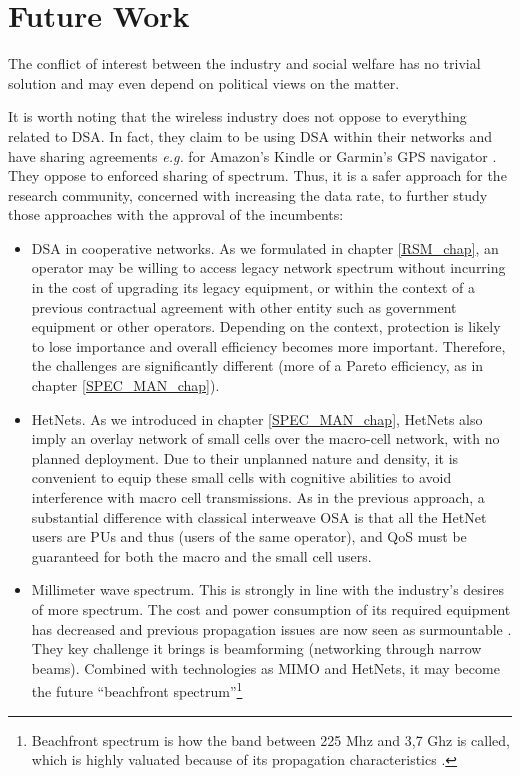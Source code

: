\section{Future Work}
The conflict of interest between the industry and social welfare has no trivial solution and may even depend on political views on the matter. 

It is worth noting that the wireless industry does not oppose to everything related to DSA. In fact, they claim to be using DSA within their networks and 
have sharing agreements \textit{e.g.} for Amazon's Kindle or Garmin's GPS navigator \cite{CTIA2011}. They oppose to enforced sharing of spectrum. Thus, it is a safer approach for the research community, concerned with increasing the data rate, to further study those approaches with the approval of the incumbents:
\begin{itemize}
\item DSA in cooperative networks. As we formulated in chapter \ref{RSM_chap}, an operator may be willing to access legacy network spectrum without incurring in the cost of upgrading its legacy equipment, or within the context of a previous contractual agreement with other entity such as government equipment or other operators. Depending on the context, protection is likely to lose importance and overall efficiency becomes more important. Therefore, the challenges are significantly different (more of a Pareto efficiency, as in chapter \ref{SPEC_MAN_chap}). %
\item HetNets. As we introduced in chapter \ref{SPEC_MAN_chap}, HetNets also imply an overlay network of small cells over the macro-cell network, with no planned deployment. Due to their unplanned nature and density, it is convenient to equip these small cells with cognitive abilities to avoid interference with macro cell transmissions. As in the previous approach, a substantial difference with classical interweave OSA is that all
the HetNet users are PUs and thus (users of the same operator), and QoS must be guaranteed for both the macro and the small cell users. 
\item Millimeter wave spectrum. This is strongly in line with the industry's desires of more spectrum. The cost and power consumption of its required equipment has decreased and previous propagation issues are now seen as surmountable \cite{Andrews2014}. They key challenge it brings is beamforming (networking through narrow beams). Combined with technologies as MIMO and HetNets, it may become the future \enquote{beachfront spectrum}\footnote{Beachfront spectrum is how the band between 225 Mhz and 3,7 Ghz is called, which is highly valuated because of its propagation characteristics \cite{AdvisorsonScience}.}

\end{itemize}
